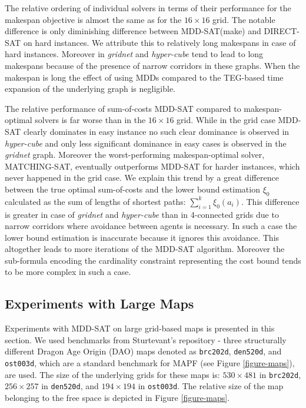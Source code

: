 \documentclass[jair,oneside,11pt]{article}
\begin{document}
The relative ordering of individual solvers in terms of their performance for the makespan objective is almost the same as for the $16{}\times{}16$ grid. The notable difference is only diminishing difference between MDD-SAT(make) and DIRECT-SAT on hard instances. We attribute this to relatively long makespans in case of hard instances. Moreover in {\em gridnet} and {\em hyper-cube} tend to lead to long makespans because of the presence of narrow corridors in these graphs. When the makespan is long the effect of using MDDs compared to the TEG-based time expansion of the underlying graph is negligible.

The relative performance of sum-of-costs MDD-SAT compared to makespan-optimal solvers is far worse than in the $16{}\times{}16$ grid. While in the grid case MDD-SAT clearly dominates in easy instance no such clear dominance is observed in {\em hyper-cube} and only less significant dominance in easy cases is observed in the {\em gridnet} graph. Moreover the worst-performing makespan-optimal solver, MATCHING-SAT, eventually outperforms MDD-SAT for harder instances, which never happened in the grid case. We explain this trend by a great difference between the true optimal sum-of-costs and the lower bound estimation $\xi_0$ calculated as the sum of lengths of shortest paths: $\sum_{i=1}^k{\xi_0(a_i)}$. This difference is greater in case of {\em gridnet} and {\em hyper-cube} than in 4-connected grids due to narrow corridors where avoidance between agents is necessary. In such a case the lower bound estimation is inaccurate because it ignores this avoidance. This altogether leads to more iterations of the MDD-SAT algorithm. Moreover the sub-formula encoding the cardinality constraint representing the cost bound tends to be more complex in such a case.

\subsection{Experiments with Large Maps}

Experiments with MDD-SAT on large grid-based maps is presented in this section. We used benchmarks from  Sturtevant's repository \cite{sturtevant2012benchmarks} - three structurally different Dragon Age Origin (DAO) maps denoted as \texttt{brc202d}, \texttt{den520d}, and \texttt{ost003d}, which are a standard benchmark for MAPF (see Figure \ref{figure-maps}), are used. The size of the underlying grids for these maps is: $530{}\times{}481$ in \texttt{brc202d},  $256{}\times{}257$ in \texttt{den520d}, and $194{}\times{}194$ in \texttt{ost003d}. The relative size of the map belonging to the free space is depicted in Figure \ref{figure-maps}.
\end{document}
